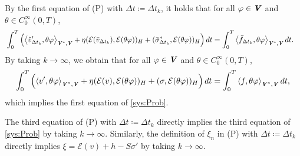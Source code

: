 \documentclass[11pt, a4paper]{article}
\newcommand{\defeq}{\coloneqq}
\newcommand{\dt}{{\Delta t}}
\newcommand{\E}{{\mathcal{E}}}
\newcommand{\bm}[1]{\textbf{\textit{#1}}}%
\newcommand{\Vv}{{\bm{V}}}
\newcommand{\Hs}{{H}}
\newcommand{\blaket}[2]{ \left\langle {#1},{#2}\right\rangle_{\Vv^*,\Vv} }
\begin{document}
By the first equation of (P) with $\dt\defeq\dt_k$, it holds that for all $\varphi\in\Vv$ and $\theta\in C^\infty_0(0,T)$,
\begin{align*}
    &\int_0^T\left(\blaket{\hat{v}'_{\dt_k}}{\theta\varphi}
    + \eta(\E(\bar{v}_{\dt_k}), \E(\theta\varphi))_\Hs + (\bar{\sigma}^*_{\dt_k}, \E(\theta\varphi))_\Hs \right)dt
    = \int_0^T\blaket{\bar{f}_{\dt_k}}{\theta\varphi} dt.
\end{align*}
By taking $k\rightarrow\infty$, we obtain that for all $\varphi\in\Vv$ and $\theta\in C^\infty_0(0,T)$,
\begin{align*}
    \int_0^T\left(\blaket{v'}{\theta\varphi}
    + \eta(\E(v), \E(\theta\varphi))_\Hs + (\sigma, \E(\theta\varphi))_\Hs \right)dt
    = \int_0^T\blaket{f}{\theta\varphi} dt,
\end{align*}
which implies the first equation of \eqref{sys:Prob}. 

The third equation of (P) with $\dt\defeq\dt_k$ directly implies the third equation of \eqref{sys:Prob} by taking $k\rightarrow\infty$. Similarly, the definition of $\xi_n$ in (P) with $\dt\defeq\dt_k$ directly implies $\xi = \E(v) + h - S\sigma'$ by taking $k\rightarrow\infty$.
\end{document}

